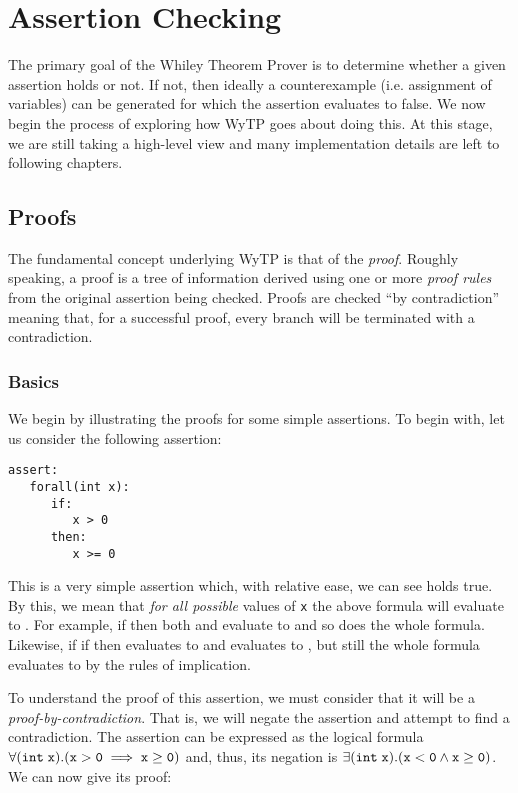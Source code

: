 \chapter{Assertion Checking}

The primary goal of the Whiley Theorem Prover is to determine whether
a given assertion holds or not.  If not, then ideally a counterexample
(i.e. assignment of variables) can be generated for which the
assertion evaluates to false.  We now begin the process of exploring
how WyTP goes about doing this.  At this stage, we are still taking a
high-level view and many implementation details are left to following
chapters.

\section{Proofs}

The fundamental concept underlying WyTP is that of the {\em proof}.
Roughly speaking, a proof is a tree of information derived using one
or more {\em proof rules} from the original assertion being checked.
Proofs are checked ``by contradiction'' meaning that, for a successful
proof, every branch will be terminated with a contradiction.

\subsection{Basics}

We begin by illustrating the proofs for some simple assertions.  To
begin with, let us consider the following assertion:

\begin{lstlisting}[language=WyAL]
assert:
   forall(int x):
      if:
         x > 0
      then:
         x >= 0
\end{lstlisting}

This is a very simple assertion which, with relative ease, we can see
holds true.  By this, we mean that {\em for all possible} values of
\lstinline{x} the above formula will evaluate to .
For example, if  then both  and
 evaluate to  and so does the
whole formula.  Likewise, if if  then  evaluates to  and 
evaluates to , but still the whole formula evaluates
to  by the rules of implication.

To understand the proof of this assertion, we must consider that it
will be a {\em proof-by-contradiction}.  That is, we will negate the
assertion and attempt to find a contradiction.  The assertion can be
expressed as the logical formula
${\tt \forall(int\;x).(x>0\implies x\ge 0)}$ and, thus, its negation
is ${\tt\exists(int\;x).(x < 0\land x\ge 0)}$.  We can now give its
proof:

